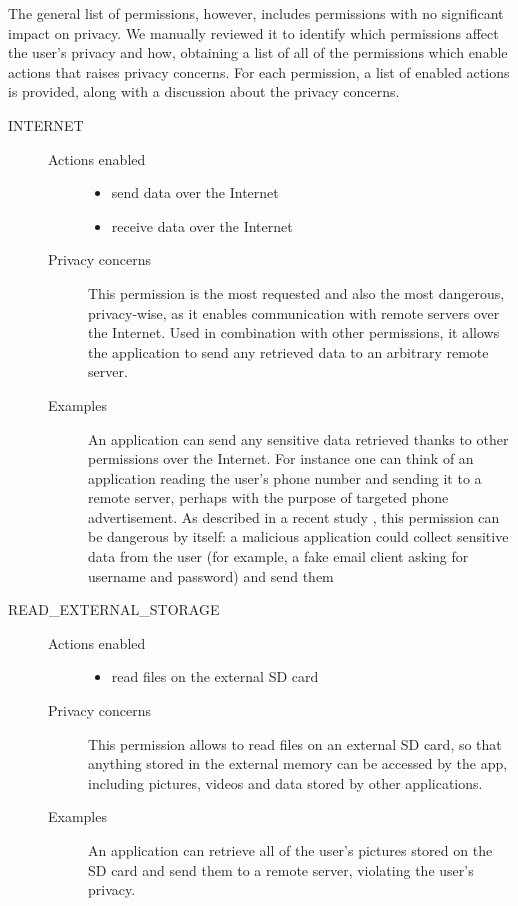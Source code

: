 The general list of permissions, however, includes permissions with no significant impact on privacy. We manually reviewed it to identify which permissions affect the user's privacy and how, obtaining a list of all of the permissions which enable actions that raises privacy concerns. For each permission, a list of enabled actions is provided, along with a discussion about the privacy concerns.

\begin{description}
    \item[INTERNET] \hfill
        \begin{description}
             \item[Actions enabled] \hfill
                \begin{itemize}
                     \item send data over the Internet
                     \item receive data over the Internet
                 \end{itemize} 
             \item[Privacy concerns]
                This permission is the most requested and also the most dangerous, privacy-wise, as it enables communication with remote servers over the Internet.
                Used in combination with other permissions, it allows the application to send any retrieved data to an arbitrary remote server.
             \item[Examples]
                An application can send any sensitive data retrieved thanks to other permissions over the Internet. For instance one can think of an application reading the user's phone number and sending it to a remote server, perhaps with the purpose of targeted phone advertisement.
                As described in a recent study \cite{stickley}, this permission can be dangerous by itself: a malicious application could collect sensitive data from the user (for example, a fake email client asking for username and password) and send them 
         \end{description} 
   
   \item[READ\_EXTERNAL\_STORAGE] \hfill
        \begin{description}
             \item[Actions enabled] \hfill
                \begin{itemize}
                     \item read files on the external SD card
                 \end{itemize} 
             \item[Privacy concerns]
                This permission allows to read files on an external SD card, so that anything stored in the external memory can be accessed by the app, including pictures, videos and data stored by other applications.
             \item[Examples]
                An application can retrieve all of the user's pictures stored on the SD card and send them to a remote server, violating the user's privacy.
         \end{description} 
    

\end{description}
